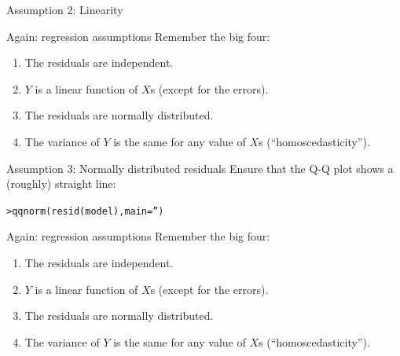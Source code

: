 \documentclass{beamer}\usepackage[]{graphicx}\usepackage[]{color}
\makeatletter
\newcommand{\hlstr}[1]{\textcolor[rgb]{1,0.894,0.71}{#1}}%
\newcommand{\hlstd}[1]{\textcolor[rgb]{1,0.894,0.769}{#1}}%
\newcommand{\hlkwc}[1]{\textcolor[rgb]{0.78,0.941,0.545}{#1}}%
\newcommand{\hlkwd}[1]{\textcolor[rgb]{1,0.78,0.769}{#1}}%
\newenvironment{kframe}{%
 \def\at@end@of@kframe{}%
 \ifinner\ifhmode%
  \def\at@end@of@kframe{\end{minipage}}%
  \begin{minipage}{\columnwidth}%
 \fi\fi%
 \def\FrameCommand##1{\hskip\@totalleftmargin \hskip-\fboxsep
 \colorbox{shadecolor}{##1}\hskip-\fboxsep
     \hskip-\linewidth \hskip-\@totalleftmargin \hskip\columnwidth}%
 \MakeFramed {\advance\hsize-\width
   \@totalleftmargin\z@ \linewidth\hsize
   \@setminipage}}%
 {\par\unskip\endMakeFramed%
 \at@end@of@kframe}
\newenvironment{knitrout}{}{} %
\makeatother
\begin{document}
\begin{darkframes}
\begin{frame}[fragile]{Assumption 2: Linearity}
\begin{knitrout}
\end{knitrout}
    \end{frame}


    \begin{frame}{Again: regression assumptions}
      Remember the big four:
      \begin{enumerate}
        \item The residuals are independent. \greencheckmark
        \item $Y$ is a linear function of $X$s (except for the errors). \greencheckmark
        \item \alert{The residuals are normally distributed.}
        \item The variance of $Y$ is the same for any value of $X$s (``homoscedasticity'').
      \end{enumerate}
    \end{frame}



    \begin{frame}[fragile]{Assumption 3: Normally distributed residuals}
      Ensure that the Q-Q plot shows a (roughly) straight line:
\begin{knitrout}
\begin{kframe}
\begin{alltt}
\hlstd{> }\hlkwd{qqnorm}\hlstd{(}\hlkwd{resid}\hlstd{(model),} \hlkwc{main}\hlstd{=}\hlstr{''}\hlstd{)}
\end{alltt}
\end{kframe}


\end{knitrout}
    \end{frame}


    \begin{frame}{Again: regression assumptions}
      Remember the big four:
      \begin{enumerate}
        \item The residuals are independent. \greencheckmark
        \item $Y$ is a linear function of $X$s (except for the errors). \greencheckmark
        \item The residuals are normally distributed. \greencheckmark
        \item \alert{The variance of $Y$ is the same for any value of $X$s (``homoscedasticity'').}
      \end{enumerate}
    \end{frame}



\end{darkframes}
\end{document}
